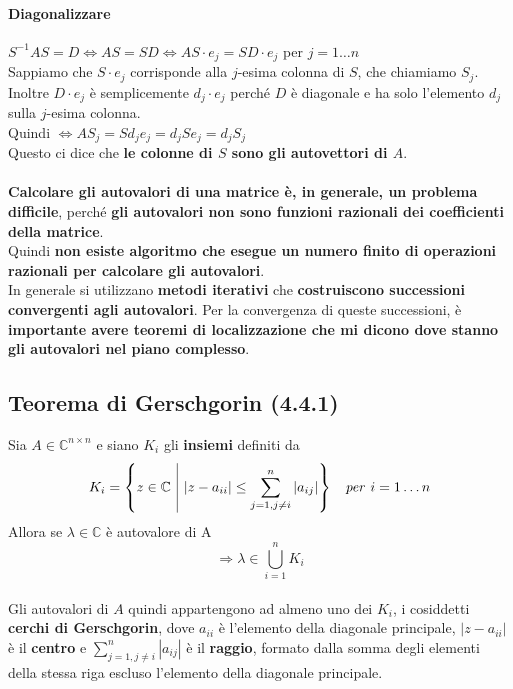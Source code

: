 \documentclass[10pt]{book}
\begin{document}
\paragraph{Diagonalizzare}
$S^{-1}AS = D \Leftrightarrow AS = SD \Leftrightarrow AS\cdot e_j = SD\cdot e_j$ per $j = 1 \ldots n$\\
Sappiamo che $S\cdot e_j$ corrisponde alla $j$-esima colonna di $S$, che chiamiamo $S_j$. Inoltre $D\cdot e_j$ è semplicemente $d_j\cdot e_j$ perché $D$ è diagonale e ha solo l'elemento $d_j$ sulla $j$-esima colonna.\\
Quindi $\Leftrightarrow AS_j = Sd_j e_j = d_j S e_j = d_j S_j$\\
Questo ci dice che \textbf{le colonne di $S$ sono gli autovettori di $A$}.\\\\
\textbf{Calcolare gli autovalori di una matrice è, in generale, un problema difficile}, perché \textbf{gli autovalori non sono funzioni razionali dei coefficienti della matrice}.\\
Quindi \textbf{non esiste algoritmo che esegue un numero finito di operazioni razionali per calcolare gli autovalori}.\\
In generale si utilizzano \textbf{metodi iterativi} che \textbf{costruiscono successioni convergenti agli autovalori}. Per la convergenza di queste successioni, è \textbf{importante avere teoremi di localizzazione che mi dicono dove stanno gli autovalori nel piano complesso}.
\subsection{Teorema di Gerschgorin (4.4.1)}
Sia $A \in \mathbb{C}^{n \times n}$ e siano $K_i$ gli \textbf{insiemi} definiti da $$K_i = \left\{z \in \mathbb{C} \:\:\vline\:\: |z-a_{ii}| \leq \sum_{j = 1, j \neq i}^n |a_{ij}|\right\}\:\:\:\:\textit{per}\:\:i = 1 \ldots n$$ Allora se $\lambda \in \mathbb{C}$ è autovalore di A $$\Rightarrow \lambda \in \bigcup_{i = 1}^n K_i$$\\
Gli autovalori di $A$ quindi appartengono ad almeno uno dei $K_i$, i cosiddetti \textbf{cerchi di Gerschgorin}, dove $a_{ii}$ è l'elemento della diagonale principale, $|z - a_{ii}|$ è il \textbf{centro} e $\sum_{j = 1, j \neq i}^n |a_{ij}|$ è il \textbf{raggio}, formato dalla somma degli elementi della stessa riga escluso l'elemento della diagonale principale.
\end{document}
